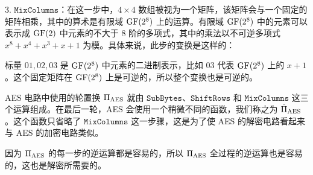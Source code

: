 3. $\mathtt{MixColumns}$：在这一步中，$4\times4$ 数组被视为一个矩阵，该矩阵会与一个固定的矩阵相乘，其中的算术是有限域 ${\rm GF}(2^8)$ 上的运算。有限域 ${\rm GF}(2^8)$ 中的元素可以表示成 ${\rm GF}(2)$ 中元素的不大于 $8$ 阶的多项式，其中的乘法以不可逆多项式 $x^8+x^4+x^3+x+1$ 为模。具体来说，此步的变换是这样的：
    
    
    标量 $01,02,03$ 是 ${\rm GF}(2^8)$ 中元素的二进制表示，比如 $03$ 代表 ${\rm GF}(2^8)$ 上的 $x+1$。这个固定矩阵在 ${\rm GF}(2^8)$ 上是可逆的，所以整个变换也是可逆的。
    

AES 电路中使用的轮置换 $\Pi_{\rm AES}$ 就由 $\mathtt{SubBytes}$、$\mathtt{ShiftRows}$ 和 $\mathtt{MixColumns}$ 这三个运算组成。在最后一轮，AES 会使用一个稍微不同的函数，我们称之为 $\hat\Pi_{\rm AES}$。这个函数只省略了 $\mathtt{MixColumns}$ 这一步骤，这是为了使 AES 的解密电路看起来与 AES 的加密电路类似。

因为 $\Pi_{\rm AES}$ 的每一步的逆运算都是容易的，所以 $\Pi_{\rm AES}$ 全过程的逆运算也是容易的，这也是解密所需要的。

